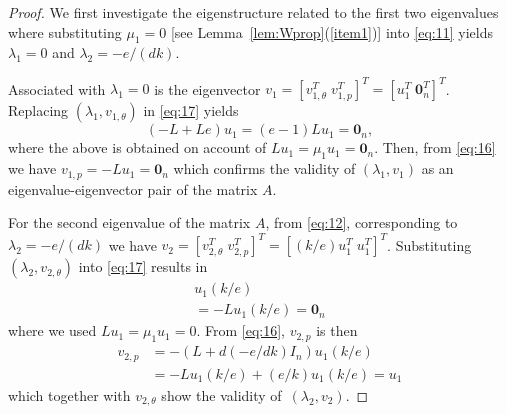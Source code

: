 \documentclass[letter, 10pt, conference]{ieeeconf}
\newcommand{\1}{\mathbf{1}}
\newcommand{\0}{\mathbf{0}}
\begin{document}
{\begin{proof}
  We first investigate the eigenstructure related to the first two
  eigenvalues where substituting $\mu_1=0$ [see
  Lemma~\ref{lem:Wprop}(\ref{item1})] into \eqref{eq:11} yields
  $\lambda_1=0$ and $\lambda_2=-e/(dk)$.
  
  Associated with $\lambda_1=0$ is the eigenvector
  $v_1=[v_{1,\theta}^T\;v_{1,p}^T]^T=[u_1^T\;\0_n^T]^T$. 
  Replacing $(\lambda_1,v_{1,\theta})$ in \eqref{eq:17} yields
  \begin{equation*}
  	(-L+Le) u_1 = (e-1) L u_1 = \0_n,
  \end{equation*}
  where the above is obtained on account of $L u_1 = \mu_1 u_1 =
  \0_n$.  Then, from \eqref{eq:16} we have $v_{1,p}=-L u_1 = \0_n$
  which confirms the validity of $(\lambda_1,v_1)$ as an
  eigenvalue-eigenvector pair of the matrix $A$.
  
  For the second eigenvalue of the matrix $A$, from \eqref{eq:12},
  corresponding to $\lambda_2=-e/(dk)$ we have $v_2=[v_{2,\theta}^T \;
  v_{2,p}^T]^T=[(k/e)u_1^T\;u_1^T]^T$.  Substituting
  $(\lambda_2,v_{2,\theta})$ into \eqref{eq:17} results in
  \begin{multline*}
  	[-L+\underbrace{(e+dk(-e/dk))}_0(L+d(-e/dk) I_n)] u_1 (k/e) \\
  	=-L u_1 (k/e) = \0_n
  \end{multline*}
  where we used $L u_1 = \mu_1 u_1 = 0$. From \eqref{eq:16}, $v_{2,p}$ is then
  \begin{align*}
  	v_{2,p}&=-(L+d(-e/dk) I_n) u_1 (k/e) \\
  	&= -L u_1 (k/e) + (e/k)u_1(k/e) = u_1
  \end{align*}
  which together with $v_{2,\theta}$ show the validity of~$(\lambda_2,v_2)$.
  

\end{proof}}
\end{document}

